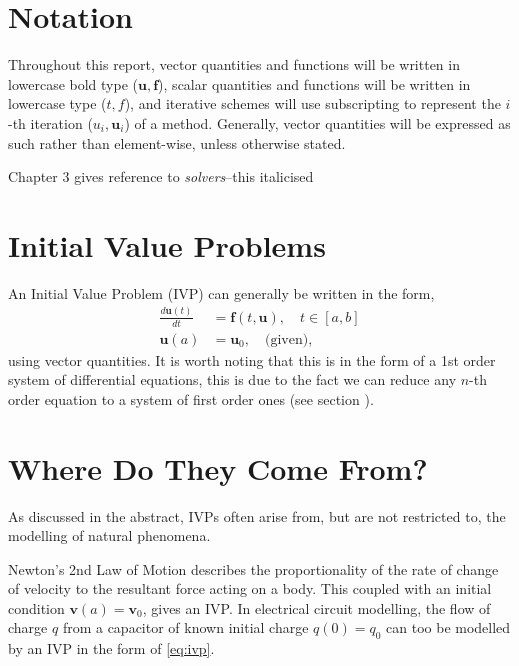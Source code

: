 \documentclass[12pt, twoside]{report}
\theoremstyle{plain}
\theoremstyle{definition}
\theoremstyle{definition}
\begin{document}
    \section{Notation}
    \label{1_notation}
        Throughout this report, vector quantities and functions will be written
        in lowercase bold type ($\mathbf{u}, \mathbf{f}$), scalar quantities 
        and functions will be written in lowercase type ($t, f$), and iterative
        schemes will use subscripting to represent the $i$-th iteration 
        ($u_{i}, \mathbf{u}_i$) of a method. Generally, vector quantities will
        be expressed as such rather than element-wise, unless otherwise stated.

        Chapter 3 gives reference to \textit{solvers}--this italicised  


    \section{Initial Value Problems}
    \label{1_ivp}
        An Initial Value Problem (IVP) can generally be written in the form,
        \begin{equation}
        \label{eq:ivp}
            \begin{split}
                \frac{d \mathbf{u}(t)}{dt}& = \mathbf{f}(t, \mathbf{u}), 
                \quad t \in [a, b]\\
                \mathbf{u}(a)& = \mathbf{u}_0, \quad \text{(given)},
            \end{split}
        \end{equation}
        using vector quantities. It is worth noting that this is in the form of
        a 1st order system of differential equations, this is due to the fact 
        we can reduce any $n$-th order equation to a system of first order ones
        (see section ).


    \section{Where Do They Come From?}
    \label{1_origins}
        As discussed in the abstract, IVPs often arise from, but are not
        restricted to, the modelling of natural phenomena. 

        Newton's 2nd Law of Motion describes the proportionality of the rate 
        of change of velocity to the resultant force acting on a body. This 
        coupled with an initial condition $\mathbf{v}(a)=\mathbf{v}_0$, gives
        an IVP. In electrical circuit modelling, the flow of charge $q$ from a
        capacitor of known initial charge $q(0)=q_0$ can too be modelled by an 
        IVP in the form of \eqref{eq:ivp}.
\end{document}
